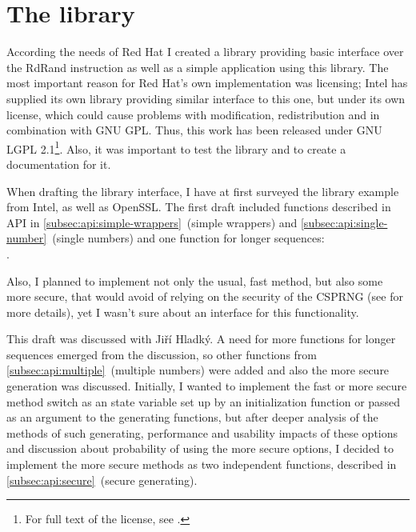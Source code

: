 \chapter{The library}  \label{chap:library}
According the needs of Red Hat I created a library providing basic interface over the RdRand instruction as well as a simple application using this library. The most important reason for Red Hat's own implementation was licensing; Intel has supplied its own library providing similar interface to this one, but under its own license, which could cause problems with modification, redistribution and in combination with GNU GPL. Thus, this work has been released under GNU LGPL 2.1\footnote{For full text of the license, see \cite{GNULGPL}.}. Also, it was important to test the library and to create a documentation for it.

When drafting the library interface, I have at first surveyed the library example from Intel\cite{IntelDRNGGuide}, as well as OpenSSL\cite{OpenSSLAPI}. The first draft included functions described in API in \ref{subsec:api:simple-wrappers}~(simple wrappers) and \ref{subsec:api:single-number}~(single numbers) and one function for longer sequences: \\. 

Also, I planned to implement not only the usual, fast method, but also some more secure, that would avoid of relying on the security of the CSPRNG (see  for more details), yet I wasn't sure about an interface for this functionality.

This draft was discussed with Jiří Hladký. A need for more functions for longer sequences emerged from the discussion, so other functions from \ref{subsec:api:multiple}~(multiple numbers) were added and also the more secure generation was discussed. Initially, I wanted to implement the fast or more secure method switch as an state variable set up by an initialization function or passed as an argument to the generating functions, but after deeper analysis of the methods of such generating, performance and usability impacts of these options and discussion about probability of using the more secure options, I decided to implement the more secure methods as two independent functions, described in \ref{subsec:api:secure}~(secure generating). 






